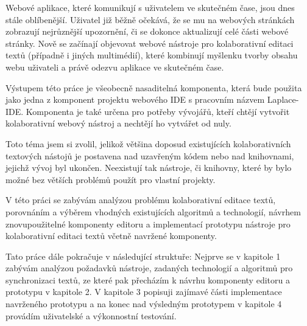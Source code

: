 \begin{introduction}

    Webové aplikace, které komunikují s uživatelem ve skutečném čase, jsou dnes stále oblíbenější.
    Uživatel již běžně očekává, že se mu na webových stránkách zobrazují nejrůznější upozornění, či se dokonce aktualizují celé části webové stránky.
    Nově se začínají objevovat webové nástroje pro kolaborativní editaci textů (případně i jiných multimédií), které kombinují myšlenku tvorby obsahu webu uživateli a právě odezvu aplikace ve skutečném čase.

    Výstupem této práce je všeobecně nasaditelná komponenta, která bude použita jako jedna z komponent projektu webového IDE s pracovním názvem Laplace-IDE.
    Komponenta je také určena pro potřeby vývojářů, kteří chtějí vytvořit kolaborativní webový nástroj a nechtějí ho vytvářet od nuly.

    Toto téma jsem si zvolil, jelikož většina doposud existujících kolaborativních textových nástojů je postavena nad uzavřeným kódem nebo nad knihovnami, jejichž vývoj byl ukončen.
    Neexistují tak nástroje, či knihovny, které by bylo možné bez větších problémů použít pro vlastní projekty.

    V této práci se zabývám analýzou problému kolaborativní editace textů, porovnáním a výběrem vhodných existujících algoritmů a technologií, návrhem znovupoužitelné komponenty editoru a implementací prototypu nástroje pro kolaborativní editaci textů včetně navržené komponenty.

    Tato práce dále pokračuje v následující struktuře:
    Nejprve se v kapitole 1 zabývám analýzou požadavků nástroje, zadaných technologií a algoritmů pro synchronizaci textů, ze které pak přecházím k návrhu komponenty editoru a prototypu v kapitole 2.
    V kapitole 3 popisuji zajímavé části implementace navrženého prototypu a na konec nad výsledným prototypem v kapitole 4 provádím uživatelské a výkonnostní testování.

\end{introduction}